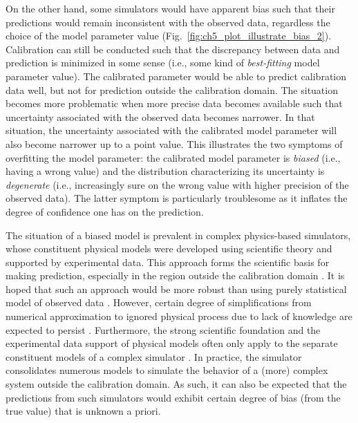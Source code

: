 On the other hand,
some simulators would have apparent bias such that their predictions would remain inconsistent with the observed data, regardless the choice of the model parameter value (Fig.~\ref{fig:ch5_plot_illustrate_bias_2}).
Calibration can still be conducted such that the discrepancy between data and prediction is minimized in some sense (i.e., some kind of \emph{best-fitting} model parameter value).
The calibrated parameter would be able to predict calibration data well, but not for prediction outside the calibration domain.
The situation becomes more problematic when more precise data becomes available such that uncertainty associated with the observed data becomes narrower.
In that situation, the uncertainty associated with the calibrated model parameter will also become narrower up to a point value.
This illustrates the two symptoms of overfitting the model parameter: the calibrated model parameter is \emph{biased} (i.e., having a wrong value) and the distribution characterizing its uncertainty is \emph{degenerate} (i.e., increasingly sure on the wrong value with higher precision of the observed data).
The latter symptom is particularly troublesome as it inflates the degree of confidence one has on the prediction.

The situation of a biased model is prevalent in complex physics-based simulators, whose constituent physical models were developed using scientific theory and supported by experimental data.
This approach forms the scientific basis for making prediction, especially in the region outside the calibration domain \cite{Arhonditsis2008}.
It is hoped that such an approach would be more robust than using purely statistical model of observed data \cite{Bayarri2007,Reichert2012}.
However, certain degree of simplifications from numerical approximation to ignored physical process due to lack of knowledge are expected to persist \cite{Beven2009}.
Furthermore, the strong scientific foundation and the experimental data support of physical models often only apply to the separate constituent models of a complex simulator \cite{Campbell2006}.
In practice, the simulator consolidates numerous models to simulate the behavior of a (more) complex system outside the calibration domain.
As such, it can also be expected that the predictions from such simulators would exhibit certain degree of bias (from the true value) that is unknown a priori.

